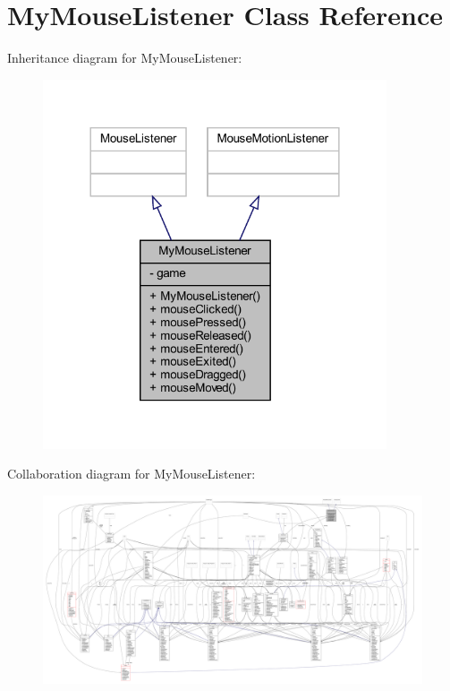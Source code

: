 \hypertarget{classinputs_1_1_my_mouse_listener}{}\section{My\+Mouse\+Listener Class Reference}
\label{classinputs_1_1_my_mouse_listener}


Inheritance diagram for My\+Mouse\+Listener\+:\nopagebreak
\begin{figure}[H]
\begin{center}
\leavevmode
\includegraphics[width=288pt]{classinputs_1_1_my_mouse_listener__inherit__graph}
\end{center}
\end{figure}


Collaboration diagram for My\+Mouse\+Listener\+:
\nopagebreak
\begin{figure}[H]
\begin{center}
\leavevmode
\includegraphics[width=350pt]{classinputs_1_1_my_mouse_listener__coll__graph}
\end{center}
\end{figure}
